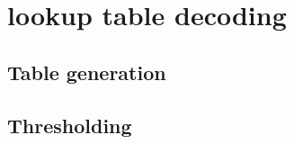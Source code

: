 \section{lookup table decoding}\label{App: lookup_table}
\subsection{Table generation}


\subsection{Thresholding}\label{App: steane_thresholding}


